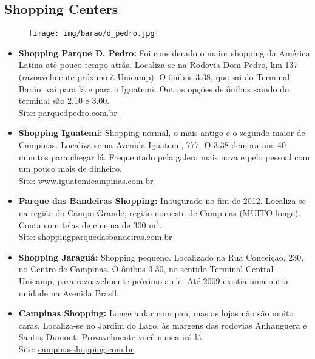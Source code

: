 \subsection{Shopping Centers}

\begin{figure}[h!]
    \centering
    \texttt{[image: img/barao/d\_pedro.jpg]}
\end{figure}

\begin{itemize}
    \item   \textbf{Shopping Parque D. Pedro:} Foi considerado o maior shopping
        da América Latina até pouco tempo atrás. Localiza-se na Rodovia Dom
        Pedro, km 137 (razoavelmente próximo à Unicamp). O ônibus 3.38, que sai
        do Terminal Barão, vai para lá e para o Iguatemi. Outras opções de
        ônibus saindo do terminal são 2.10 e 3.00.
        \\Site: \url{parquedpedro.com.br}

    \item   \textbf{Shopping Iguatemi:} Shopping normal, o mais antigo e o
        segundo maior de Campinas. Localiza-se na Avenida Iguatemi, 777. O 3.38
        demora uns 40 minutos para chegar lá. Frequentado pela galera mais nova
        e pelo pessoal com um pouco mais de dinheiro.
        \\Site: \url{www.iguatemicampinas.com.br}

    \item   \textbf{Parque das Bandeiras Shopping:} Inaugurado no fim de 2012.
        Localiza-se na região do Campo Grande, região noroeste de Campinas 
        (MUITO longe). Conta com telas de cinema de 300 m$^{2}$.
        \\Site: \url{shoppingparquedasbandeiras.com.br}

    \item   \textbf{Shopping Jaraguá:} Shopping pequeno. Localizado na Rua Conceiçao, 
         230, no Centro de Campinas. O ônibus 3.30, no sentido Terminal Central -- Unicamp,
         para razoavelmente próximo a ele. Até 2009 existia uma outra unidade na 
         Avenida Brasil.

    \item   \textbf{Campinas Shopping:} Longe a dar com pau, mas as lojas não
        são muito caras. Localiza-se no Jardim do Lago, às margens das rodovias 
        Anhanguera e Santos Dumont. Provavelmente você nunca irá lá.
        \\Site: \url{campinasshopping.com.br}


\end{itemize}
